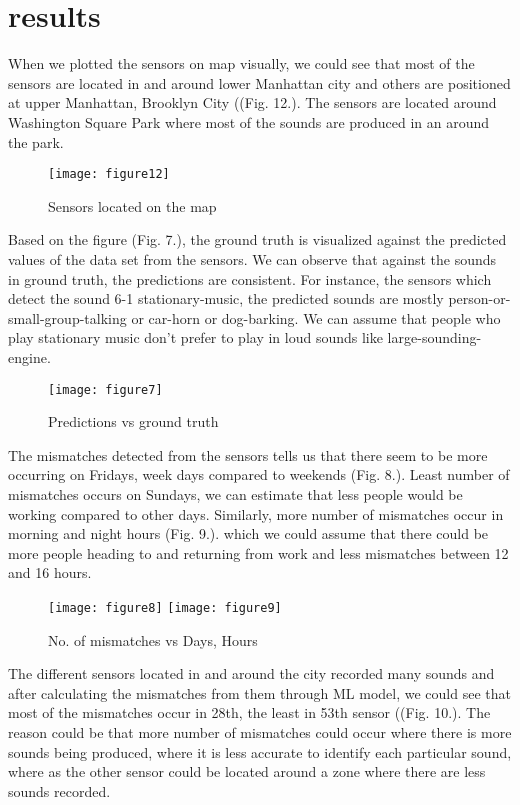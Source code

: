 	\section{results}

	When we plotted the sensors on map visually, we could see that most of the sensors are located in and around lower Manhattan city and others are positioned at upper Manhattan, Brooklyn City ((Fig. 12.). The sensors are located around Washington Square Park where most of the sounds are produced in an around the park. 

	\begin{figure}[h!]
		\centering
		\texttt{[image: figure12]}
		\caption{Sensors located on the map}
	\end{figure}

	Based on the figure (Fig. 7.), the ground truth is visualized against the predicted values of the data set from the sensors. We can observe that against the sounds in ground truth, the predictions are consistent. For instance, the sensors which detect the sound 6-1 stationary-music, the predicted sounds are mostly person-or-small-group-talking or car-horn or dog-barking. We can assume that people who play stationary music don't prefer to play in loud sounds like large-sounding-engine.  

	\begin{figure}[h!]
		\texttt{[image: figure7]}
		\caption{Predictions vs ground truth}
	\end{figure}

	The mismatches detected from the sensors tells us that there seem to be more occurring on Fridays, week days compared to weekends (Fig. 8.). Least number of mismatches occurs on Sundays, we can estimate that less people would be working compared to other days.
	Similarly, more number of mismatches occur in morning and night hours (Fig. 9.). which we could assume that there could be more people heading to and returning from work and less mismatches between 12 and 16 hours.


	\begin{figure}[h!]
		\centering
		\texttt{[image: figure8]}
		\texttt{[image: figure9]}
		\caption{No. of mismatches vs Days, Hours}
	\end{figure}

	The different sensors located in and around the city recorded many sounds and after calculating the mismatches from them through ML model, we could see that most of the mismatches occur in 28th, the least in 53th sensor ((Fig. 10.). The reason could be that more number of mismatches could occur where there is more sounds being produced, where it is less accurate to identify each particular sound, where as the other sensor could be located around a zone where there are less sounds recorded.

